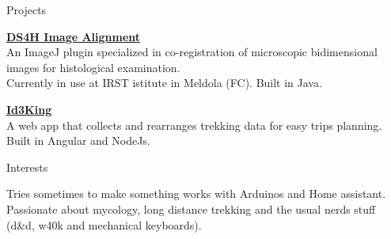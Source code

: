 \documentclass{resume} %
\begin{document}
\begin{rSection}{Projects}

{\bf \href{https://imagej.net/plugins/ds4h-image-alignment}{DS4H Image Alignment}}
\\ An ImageJ plugin specialized in co-registration of microscopic bidimensional images for histological examination.\\
Currently in use at IRST istitute in Meldola (FC). Built in Java.

{\bf \href{https://github.com/illeb/id3king}{Id3King}}
\\ A web app that collects and rearranges trekking data for easy trips planning.\\
Built in Angular and NodeJs.

\end{rSection}


\begin{rSection}{Interests}

  Tries sometimes to make something works with Arduinos and Home assistant. Passionate about mycology, long distance trekking and the usual nerds stuff (d\&d, w40k and mechanical
 keyboards).
\end{rSection}
\end{document}
